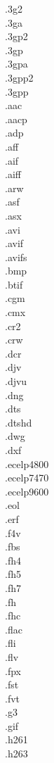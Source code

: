 .3g2\\
.3ga\\
.3gp2\\
.3gp\\
.3gpa\\
.3gpp2\\
.3gpp\\
.aac\\
.aacp\\
.adp\\
.aff\\
.aif\\
.aiff\\
.arw\\
.asf\\
.asx\\
.avi\\
.avif\\
.avifs\\
.bmp\\
.btif\\
.cgm\\
.cmx\\
.cr2\\
.crw\\
.dcr\\
.djv\\
.djvu\\
.dng\\
.dts\\
.dtshd\\
.dwg\\
.dxf\\
.ecelp4800\\
.ecelp7470\\
.ecelp9600\\
.eol\\
.erf\\
.f4v\\
.fbs\\
.fh4\\
.fh5\\
.fh7\\
.fh\\
.fhc\\
.flac\\
.fli\\
.flv\\
.fpx\\
.fst\\
.fvt\\
.g3\\
.gif\\
.h261\\
.h263\\
